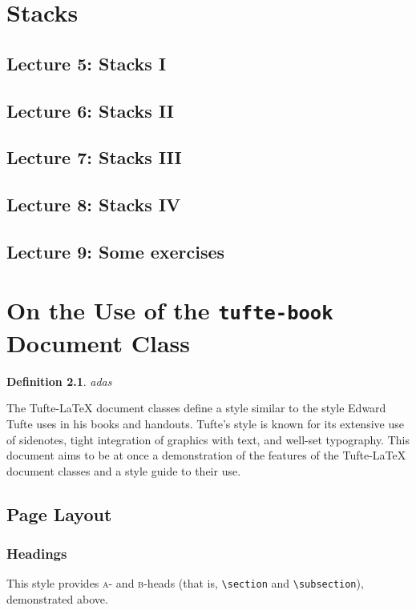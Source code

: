 \documentclass{tufte-book} %
\newcommand{\TL}{Tufte-\LaTeX\xspace}
\numberwithin{dummy}{section}
\newtheorem{dfn}[thm]{Definition}
\begin{document}
\chapter{Stacks}
\section{Lecture 5: Stacks I}
\section{Lecture 6: Stacks II}
\section{Lecture 7: Stacks III}
\section{Lecture 8: Stacks IV}
\section{Lecture 9: Some exercises}
\chapter[On the Use of the tufte-book Document Class]{On the Use of the \texttt{tufte-book} Document Class}
\label{ch:tufte-book}

\begin{dfn}
adas
\end{dfn}
The \TL document classes define a style similar to the style Edward Tufte uses in his books and handouts. Tufte's style is known for its extensive use of sidenotes, tight integration of graphics with text, and well-set typography. This document aims to be at once a demonstration of the features of the \TL document classes and a style guide to their use.


\section{Page Layout}\label{sec:page-layout}
\subsection{Headings}\label{sec:headings}
This style provides \textsc{a}- and \textsc{b}-heads (that is, \Verb|\section| and \Verb|\subsection|), demonstrated above.
\end{document}
